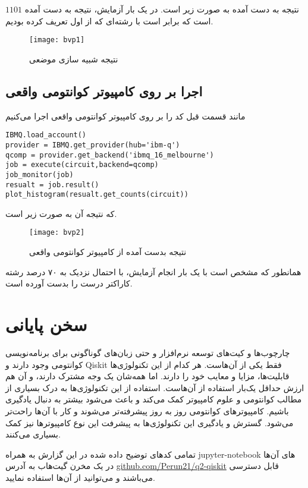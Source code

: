\documentclass[a4paper,11pt,oneside,openany]{iut-thesis}
\begin{document}
نتیجه به دست آمده به صورت زیر است. در یک بار آزمایش، نتیجه به دست آمده $1101$ است که برابر است با رشته‌ای که از اول تعریف کرده بودیم.
\begin{figure}[h]
	\centering
	\texttt{[image: bvp1]}
	\caption{
	نتیجه شبیه سازی موضعی
	}
	\label{bvp1}
\end{figure}
\subsection{
اجرا بر روی کامپیوتر کوانتومی واقعی
}
مانند قسمت قبل کد را بر روی کامپیوتر کوانتومی واقعی اجرا می‌کنیم
\begin{latin}
\begin{lstlisting}[style=Mypython]
IBMQ.load_account()
provider = IBMQ.get_provider(hub='ibm-q')
qcomp = provider.get_backend('ibmq_16_melbourne')
job = execute(circuit,backend=qcomp)
job_monitor(job)
resualt = job.result()
plot_histogram(resualt.get_counts(circuit))
\end{lstlisting}
\end{latin}
که نتیجه آن به صورت زیر است.
\begin{figure}[h]
	\centering
	\texttt{[image: bvp2]}
	\caption{
	نتیجه بدست آمده از کامپیوتر کوانتومی واقعی
	}
	\label{bvp2}
\end{figure}
همانطور که مشخص است با یک بار انجام آزمایش، با احتمال نزدیک به ۷۰ درصد رشته کاراکتر درست را بدست آورده است.

\section{
سخن پایانی
}

چارچوب‌ها و کیت‌های توسعه نرم‌افزار و حتی زبان‌های گوناگونی برای برنامه‌نویسی کوانتومی وجود دارند و Qiskit فقط یکی از آن‌هاست. هر کدام از این تکنولوژی‌ها قابلیت‌ها، مزایا و معایب خود را دارند. اما  همه‌شان یک وجه مشترک‌ دارند، و آن هم ارزش حداقل یک‌بار استفاده از آن‌هاست. استفاده از این تکنولوژی‌ها به درک بسیاری از مطالب کوانتومی و علوم کامپیوتر کمک می‌کند و باعث می‌شود بیشتر به دنبال یادگیری باشیم.  کامپیوترهای کوانتومی روز به روز پیشرفته‌تر می‌شوند و کار با آن‌ها راحت‌تر می‌شود. گسترش و یادگیری این تکنولوژی‌ها به پیشرفت این نوع کامپیوترها نیز کمک بسیاری می‌کنند. 

تمامی کدهای توضیح داده شده در این گزارش به همراه jupyter-notebook های آن‌ها در یک مخرن گیت‌هاب به آدرس \url{github.com/Perun21/q2-qiskit} قابل دسترسی می‌باشند و می‌توانید از آن‌ها استفاده نمایید.
\end{document}
